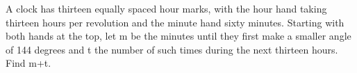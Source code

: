 A clock has thirteen equally spaced hour marks, with the hour hand taking thirteen hours per revolution and the minute hand sixty minutes. Starting with both hands at the top, let m be the minutes until they first make a smaller angle of 144 degrees and t the number of such times during the next thirteen hours. Find m+t.

